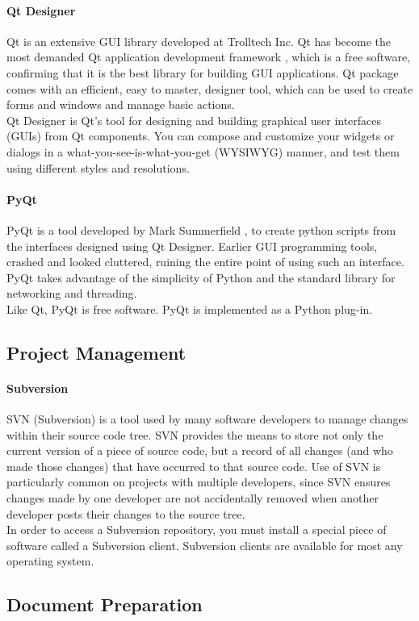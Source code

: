 \documentclass[a4paper,10pt]{iesreport}
\begin{document}
\paragraph*{Qt Designer}
Qt is an extensive GUI library developed at Trolltech Inc. Qt has become the most demanded  Qt application development framework , which is a free software, confirming that it is the best library for building GUI applications. Qt package comes with an efficient, easy to master, designer tool, which can be used to create forms and windows and manage basic actions. 
\\
Qt Designer is Qt's tool for designing and building graphical user interfaces (GUIs) from Qt components. You can compose and customize your widgets or dialogs in a what-you-see-is-what-you-get (WYSIWYG) manner, and test them using different styles and resolutions.
\paragraph*{PyQt}
PyQt is a tool developed by Mark Summerfield , to create python scripts from the interfaces designed using Qt Designer. Earlier GUI programming tools, crashed and looked cluttered, ruining the entire point of using such an interface. PyQt takes advantage of the simplicity of Python and the standard library for networking and threading. 
\\
Like Qt, PyQt is free software. PyQt is implemented as a Python plug-in.
\subsection{Project Management}
\paragraph*{Subversion}
SVN (Subversion) is a tool used by many software developers to manage changes within their source code tree. SVN provides the means to store not only the current version of a piece of source code, but a record of all changes (and who made those changes) that have occurred to that source code. Use of SVN is particularly common on projects with multiple developers, since SVN ensures changes made by one developer are not accidentally removed when another developer posts their changes to the source tree.
\\
In order to access a Subversion repository, you must install a special piece of software called a Subversion client. Subversion clients are available for most any operating system.
\subsection{Document Preparation}
\end{document}
